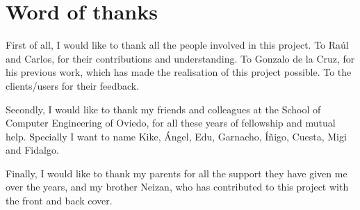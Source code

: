 
\chapter*{Word of thanks}

First of all, I would like to thank all the people involved in this project. To Raúl and Carlos, for their contributions and understanding. To Gonzalo de la Cruz, for his previous work, which has made the realisation of this project possible. To the clients/users for their feedback. 

Secondly, I would like to thank my friends and colleagues at the School of Computer Engineering of Oviedo, for all these years of fellowship and mutual help. Specially I want to name Kike, Ángel, Edu, Garnacho, Íñigo, Cuesta, Migi and Fidalgo. 

Finally, I would like to thank my parents for all the support they have given me over the years, and my brother Neizan, who has contributed to this project with the front and back cover.

